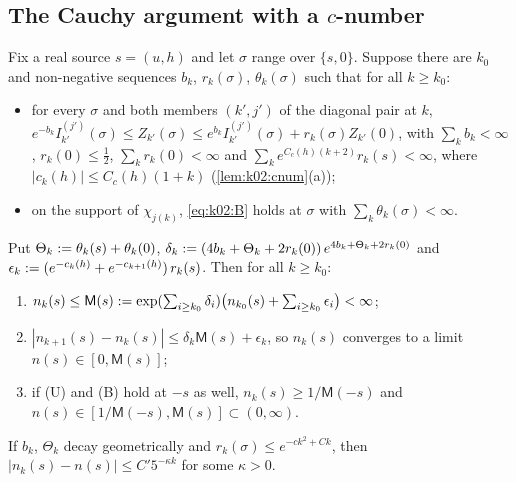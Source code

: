 \subsection{The Cauchy argument with a $c$-number}\label{ssec:k02:CAh}

\begin{theorem}\label{thm:k02:CAh}
Fix a real source $s=(u,h)$ and let $\sigma$ range over $\{s,0\}$. Suppose there are $k_0$ and non-negative sequences $b_k$, $r_k(\sigma)$, $\theta_k(\sigma)$ such that for all $k\ge k_0$:
\begin{itemize}[leftmargin=2em]
\item[\textup{(U)}] for every $\sigma$ and both members $(k',j')$ of the diagonal pair at $k$,
$e^{-b_k}I^{(j')}_{k'}(\sigma)\le Z_{k'}(\sigma)\le e^{b_k}I^{(j')}_{k'}(\sigma)+r_k(\sigma)Z_{k'}(0)$, with $\sum_kb_k<\infty$, $r_k(0)\le\frac12$, $\sum_kr_k(0)<\infty$ and $\sum_ke^{C_c(h)(k+2)}r_k(s)<\infty$, where $|c_k(h)|\le C_c(h)(1+k)$ (\cref{lem:k02:cnum}\textup{(a)});
\item[\textup{(B)}] on the support of $\chi_{j(k)}$, \eqref{eq:k02:B} holds at $\sigma$ with $\sum_k\theta_k(\sigma)<\infty$.
\end{itemize}
Put $\Theta_k:=\theta_k(s)+\theta_k(0)$, $\delta_k:=(4b_k+\Theta_k+2r_k(0))\,e^{4b_k+\Theta_k+2r_k(0)}$ and $\epsilon_k:=(e^{-c_k(h)}+e^{-c_{k+1}(h)})\,r_k(s)$. Then for all $k\ge k_0$:
\begin{enumerate}[label=\textup{(\roman*)},leftmargin=*]
\item $n_k(s)\le\mathsf M(s):=\exp(\sum_{i\ge k_0}\delta_i)\big(n_{k_0}(s)+\sum_{i\ge k_0}\epsilon_i\big)<\infty$;
\item $|n_{k+1}(s)-n_k(s)|\le\delta_k\mathsf M(s)+\epsilon_k$, so $n_k(s)$ converges to a limit $n(s)\in[0,\mathsf M(s)]$;
\item if \textup{(U)} and \textup{(B)} hold at $-s$ as well, $n_k(s)\ge1/\mathsf M(-s)$ and $n(s)\in[1/\mathsf M(-s),\mathsf M(s)]\subset(0,\infty)$.
\end{enumerate}
If $b_k$, $\Theta_k$ decay geometrically and $r_k(\sigma)\le e^{-ck^2+Ck}$, then $|n_k(s)-n(s)|\le C'5^{-\kappa k}$ for some $\kappa>0$.
\end{theorem}

